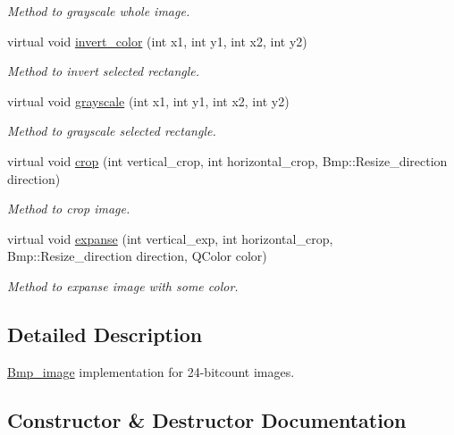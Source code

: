 \begin{DoxyCompactItemize}
\begin{DoxyCompactList}\small\item\em Method to grayscale whole image. \end{DoxyCompactList}\item 
virtual void \hyperlink{classBmp__image24_a428263c22edd8305804f079611a790c4}{invert\+\_\+color} (int x1, int y1, int x2, int y2)
\begin{DoxyCompactList}\small\item\em Method to invert selected rectangle. \end{DoxyCompactList}\item 
virtual void \hyperlink{classBmp__image24_a0e4ceb95e6b1ecd4f04ea2a025682591}{grayscale} (int x1, int y1, int x2, int y2)
\begin{DoxyCompactList}\small\item\em Method to grayscale selected rectangle. \end{DoxyCompactList}\item 
virtual void \hyperlink{classBmp__image24_a67fc5d7ff1d4d1886bf75b0cc56c8f4f}{crop} (int vertical\+\_\+crop, int horizontal\+\_\+crop, Bmp\+::\+Resize\+\_\+direction direction)
\begin{DoxyCompactList}\small\item\em Method to crop image. \end{DoxyCompactList}\item 
virtual void \hyperlink{classBmp__image24_a98e984b9e2edba193c5abe1a8372f0a8}{expanse} (int vertical\+\_\+exp, int horizontal\+\_\+crop, Bmp\+::\+Resize\+\_\+direction direction, Q\+Color color)
\begin{DoxyCompactList}\small\item\em Method to expanse image with some color. \end{DoxyCompactList}\end{DoxyCompactItemize}


\subsection{Detailed Description}
\hyperlink{classBmp__image}{Bmp\+\_\+image} implementation for 24-\/bitcount images. 

\subsection{Constructor \& Destructor Documentation}
